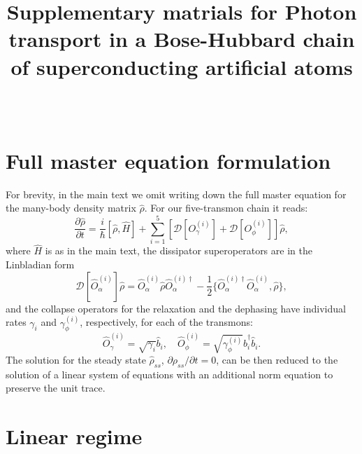\documentclass[%
 aps, pra,
 amsmath,amssymb,
 preprint,%
superscriptaddress
]{revtex4-2}
\newcommand{\mytitile}{Supplementary matrials for Photon transport in a Bose-Hubbard chain of superconducting artificial atoms}
\begin{document}
	
	\title[\mytitile]{\mytitile\\~}
	
\maketitle

\section{Full master equation formulation}

For brevity, in the main text we omit writing down the full master equation for the many-body density matrix $\hat \rho$. For our five-transmon chain it reads:
\[
\frac{\partial \hat \rho}{\partial t} = \frac{i}{\hbar} [\hat \rho, \hat H] + \sum_{i=1}^5 \left[ \mathcal{D}[O_\gamma^{(i)}] + \mathcal{D}[O_\phi^{(i)}] \right]\hat \rho,
\]
where $\hat H$ is as in the main text, the dissipator superoperators are in the Linbladian form 
\[\mathcal D[\hat{O}^{(i)}_\alpha]\hat \rho = \hat{O}^{(i)}_\alpha \hat \rho \hat{O}^{(i)\dag}_\alpha - \frac{1}{2}\{\hat{O}^{(i)\dag}_\alpha \hat{O}^{(i)}_\alpha, \hat \rho\},
\]
and the collapse operators for the relaxation and the dephasing have individual rates $\gamma_i$ and $\gamma_\phi^{(i)}$, respectively, for each of the transmons:
\[
 \hat{O}^{(i)}_\gamma = \sqrt{\gamma_i} \hat b_i,\quad \hat{O}^{(i)}_\phi = \sqrt{\gamma^{(i)}_\phi} \hat b_i^\dag \hat b_i.
\]
The solution for the steady state $\hat\rho_{ss}$, $\partial \rho_{ss}/\partial t = 0$, can be then reduced to the solution of a linear system of equations with an additional norm equation to preserve the unit trace.

\section{Linear regime} \label{sec:app_linear}
\end{document}
